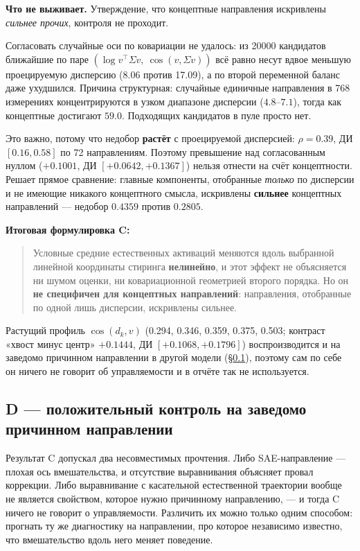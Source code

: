 \documentclass[10pt,a4paper]{article}
\begin{document}
\textbf{Что не выживает.} Утверждение, что концептные направления искривлены
\emph{сильнее прочих}, контроля не проходит.

Согласовать случайные оси по ковариации не удалось: из 20000 кандидатов
ближайшие по паре $(\log v^\top\Sigma v,\ \cos(v,\Sigma v))$ всё равно несут
вдвое меньшую проецируемую дисперсию (8.06 против 17.09), а по второй переменной
баланс даже ухудшился. Причина структурная: случайные единичные направления в
768 измерениях концентрируются в узком диапазоне дисперсии ($4.8$–$7.1$), тогда
как концептные достигают $59.0$. Подходящих кандидатов в пуле просто нет.

Это важно, потому что недобор \textbf{растёт} с проецируемой дисперсией:
$\rho = 0.39$, ДИ $[0.16, 0.58]$ по 72 направлениям. Поэтому превышение над
согласованным нуллом ($+0.1001$, ДИ $[+0.0642, +0.1367]$) нельзя отнести на счёт
концептности. Решает прямое сравнение: главные компоненты,
отобранные \emph{только} по дисперсии и не имеющие никакого концептного смысла,
искривлены \textbf{сильнее} концептных направлений — недобор $0.4359$ против
$0.2805$.

\textbf{Итоговая формулировка C:}

\begin{quote}
Условные средние естественных активаций меняются вдоль выбранной линейной
координаты стиринга \textbf{нелинейно}, и этот эффект не объясняется ни шумом
оценки, ни ковариационной геометрией второго порядка. Но он \textbf{не специфичен
для концептных направлений}: направления, отобранные по одной лишь дисперсии,
искривлены сильнее.
\end{quote}

Растущий профиль $\cos(d_k, v)$ (0.294, 0.346, 0.359, 0.375, 0.503; контраст
«хвост минус центр» $+0.1444$, ДИ $[+0.1068, +0.1796]$) воспроизводится и на
заведомо причинном направлении в другой модели (\S\ref{sec:refusalD}), поэтому
сам по себе он ничего не говорит об управляемости и в отчёте так не
используется.

\subsection{D — положительный контроль на заведомо причинном направлении}\label{sec:refusalD}

Результат C допускал два несовместимых прочтения. Либо SAE-направление — плохая
ось вмешательства, и отсутствие выравнивания объясняет провал коррекции. Либо
выравнивание с касательной естественной траектории вообще не является свойством,
которое нужно причинному направлению, — и тогда C ничего не говорит о
управляемости. Различить их можно только одним способом: прогнать ту же
диагностику на направлении, про которое независимо известно, что вмешательство
вдоль него меняет поведение.
\end{document}
